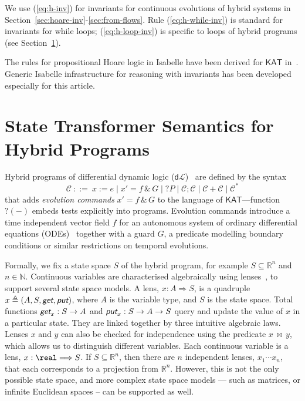 \documentclass[envcountsame]{llncs}
\newcommand{\KAT}{\mathsf{KAT}}
\newcommand{\dL}{\mathsf{d}\mathcal{L}}
\newcommand{\reals}{\mathbb{R}}
\newcommand{\defs}{\triangleq}
\newcommand{\lput}{\textit{\textsf{put}}}
\newcommand{\lget}{\textit{\textsf{get}}}
\newcommand{\lto}{\Longrightarrow}
\newcommand{\lindep}{\mathop{\,\bowtie\,}}
\begin{document}
We use (\ref{eq:h-inv}) for invariants for continuous
evolutions of hybrid systems in Section~\ref{sec:hoare-inv}-\ref{sec:from-flows}. Rule (\ref{eq:h-while-inv})
is standard for  invariants for while loops;
(\ref{eq:h-loop-inv}) is specific to loops of hybrid programs (see
Section~\ref{sec:sta-hybrid}).

The rules for propositional Hoare logic in Isabelle have been derived
for $\KAT$ in~\cite{afp:kat,afp:vericomp}. Generic Isabelle
infrastructure for reasoning with invariants has been developed
especially for this article.



\section{State Transformer Semantics for Hybrid
  Programs}\label{sec:sta-hybrid}


Hybrid programs of differential dynamic logic ($\dL$)~\cite{Platzer18}
are defined by the syntax
\begin{equation*}
\mathcal{C}\ ::= \ x:=e \mid x' = f \, \&\, G \mid ?P\mid \mathcal{C};\mathcal{C}\mid \mathcal{C}+\mathcal{C}\mid \mathcal{C}^*
\end{equation*}
that adds \emph{evolution commands} $x' = f \, \&\, G$ to the language
of $\KAT$---function $?(-)$ embeds tests explicitly into programs.
Evolution commands introduce a time independent vector field $f$ for
an autonomous system of ordinary differential equations
(ODEs)~\cite{Teschl12} together with a guard $G$, a predicate
modelling boundary conditions or similar restrictions on temporal
evolutions. %

Formally, we fix a state space $S$ of the hybrid program, for example
$S\subseteq \reals^n$ and $n\in\mathbb{N}$. Continuous variables are characterised
algebraically using lenses~\cite{FosterZW16}, to support several state space
models. A lens, $x : A \lto S$, is a quadruple $x \defs (A, S, \lget, \lput)$, where
$A$ is the variable type, and $S$ is the state space. Total functions
$\lget_x : S \to A$ and $\lput_x : S \to A \to S$ query and update the value of $x$
in a particular state. They are linked together by three intuitive algebraic
laws. Lenses $x$ and $y$ can also be checked for independence using the predicate
$x \lindep y$, which allows us to distinguish different variables. Each continuous
variable is a lens, $x : \real \lto S$. If $S \subseteq \reals^n$, then there are
$n$ independent lenses, $x_1 \cdots x_n$, that each corresponds to a projection from
$\reals^n$. However, this is not the only possible state space, and more complex
state space models --- such as matrices, or infinite Euclidean spaces -- can be
supported as well.
\end{document}
